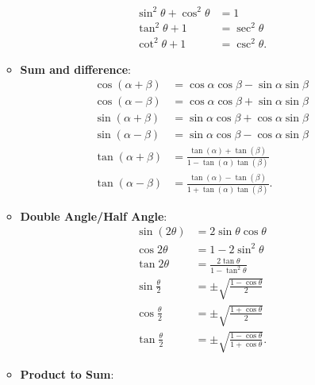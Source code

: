 \documentclass{report}
\begin{document}
\begin{itemize}
\begin{itemize}
                    \begin{align*}
                        \sin^{2}{\theta} + \cos^{2}{\theta} &= 1 \\
                        \tan^{2}{\theta} +1 &= \sec^{2}{\theta} \\
                        \cot^{2}{\theta } + 1 &= \csc^{2}{\theta }
                    .\end{align*}
                \item \textbf{Sum and difference}:
                    \begin{align*}
                        \cos{(\alpha + \beta)} &= \cos{\alpha}\cos{\beta} - \sin{\alpha}\sin{\beta} \\
                        \cos{(\alpha - \beta)} &= \cos{\alpha}\cos{\beta} + \sin{\alpha}\sin{\beta} \\
                        \sin{(\alpha + \beta)} &= \sin{\alpha}\cos{\beta} + \cos{\alpha}\sin{\beta} \\
                        \sin{(\alpha - \beta)} &= \sin{\alpha}\cos{\beta} - \cos{\alpha}\sin{\beta} \\
                        \tan{(\alpha + \beta)} &= \frac{\tan(\alpha) + \tan(\beta)}{1-\tan(\alpha)\tan(\beta)}  \\
                        \tan{(\alpha - \beta)} &= \frac{\tan(\alpha) - \tan(\beta)}{1+\tan(\alpha)\tan(\beta)}  
                    .\end{align*}
                \item \textbf{Double Angle/Half Angle}:
                    \begin{align*}
                        \sin{(2\theta )} &= 2\sin{\theta }\cos{\theta }  \\
                        \cos{2\theta } &= 1- 2\sin^{2}{\theta }  \\
                        \tan{2\theta} &= \frac{2\tan{\theta }}{1-\tan^{2}{\theta }} \\
                        \sin{\frac{\theta}{2}}  &= \pm \sqrt{\frac{1-\cos{\theta }}{2}} \\
                        \cos{\frac{\theta}{2}} &=  \pm \sqrt{\frac{1+\cos{\theta }}{2}} \\
                        \tan{\frac{\theta }{2}} &= \pm \sqrt{\frac{1-\cos{\theta }}{1+\cos{\theta }}}
                    .\end{align*}
                \item \textbf{Product to Sum}: 
                    \begin{align*}

\end{align*}
\end{itemize}
\end{itemize}
\end{document}
